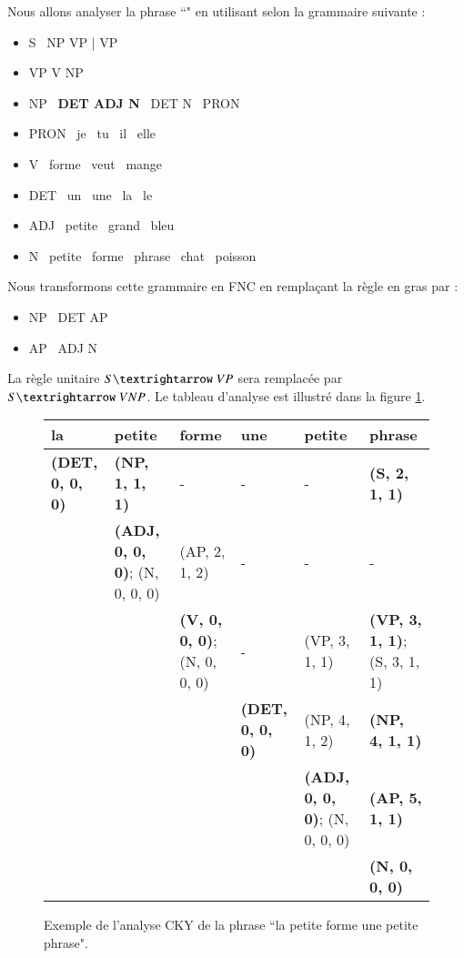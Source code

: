 \documentclass{KodeBook}
\begin{document}
Nous allons analyser la phrase ``" en utilisant  selon la grammaire suivante :
\begin{itemize}
	\item S \textrightarrow\ NP VP | VP
	\item VP \textrightarrow V NP
	\item NP \textrightarrow\ \textbf{DET ADJ N} \textbar\ DET N \textbar\ PRON 
	\item PRON \textrightarrow\ je \textbar\ tu \textbar\ il \textbar\ elle
	\item V \textrightarrow\ forme \textbar\ veut \textbar\ mange 
	\item DET \textrightarrow\ un \textbar\ une \textbar\ la \textbar\ le
	\item ADJ \textrightarrow\ petite \textbar\ grand \textbar\ bleu 
	\item N \textrightarrow\ petite \textbar\ forme \textbar\ phrase \textbar\ chat \textbar\ poisson
\end{itemize}
Nous transformons cette grammaire en FNC en remplaçant la règle en gras par : 
\begin{itemize}
	\item NP \textrightarrow\ DET AP
	\item AP \textrightarrow\ ADJ N
\end{itemize}
La règle unitaire $S \textrightarrow\ VP$ sera remplacée par $S \textrightarrow\ V NP$.
Le tableau d'analyse est illustré dans la figure \ref{fig:exp-cky-trait}.

\begin{figure}[ht]
\begin{tabular}{|p{2.3cm}|p{2.5cm}|p{2.3cm}|p{2.3cm}|p{2.5cm}|p{2.2cm}|}
	\hline
	la & petite & forme & une & petite & phrase \\
	\hline
	\textbf{(DET, 0, 0, 0)} & \textbf{(NP, 1, 1, 1)} & - & - & - & \textbf{(S, 2, 1, 1)} \\
	\hline
	\multicolumn{1}{l|}{}& \textbf{(ADJ, 0, 0, 0)}; (N, 0, 0, 0) & (AP, 2, 1, 2) & - & - & - \\
	\cline{2-6}
	\multicolumn{2}{l|}{}& \textbf{(V, 0, 0, 0)}; (N, 0, 0, 0) & - & (VP, 3, 1, 1) & \textbf{(VP, 3, 1, 1)}; (S, 3, 1, 1) \\
	\cline{3-6}
	\multicolumn{3}{l|}{}& \textbf{(DET, 0, 0, 0)} & (NP, 4, 1, 2) & \textbf{(NP, 4, 1, 1)} \\
	\cline{4-6}
	\multicolumn{4}{l|}{}& \textbf{(ADJ, 0, 0, 0)}; (N, 0, 0, 0) & \textbf{(AP, 5, 1, 1)} \\
	\cline{5-6}
	\multicolumn{5}{l|}{}& \textbf{(N, 0, 0, 0)} \\
	\cline{6-6}
\end{tabular}
\caption[Exemple de l'analyse CKY.]{Exemple de l'analyse CKY de la phrase ``la petite forme une petite phrase".}
\label{fig:exp-cky-trait}
\end{figure}
\end{document}

